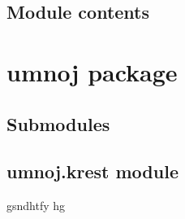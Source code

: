 \documentclass[letterpaper,10pt,english]{sphinxmanual}
\begin{document}
\begin{fulllineitems}
\label{\detokenize{sum:sum.plus.mary}}
\pysigstartsignatures
{}
\pysigstopsignatures\begin{description}
\begin{quote}\begin{description}
\end{description}\end{quote}

\end{description}

\end{fulllineitems}



\subsection{Module contents}
\label{\detokenize{sum:module-sum}}\label{\detokenize{sum:module-contents}}
\sphinxstepscope


\section{umnoj package}
\label{\detokenize{umnoj:umnoj-package}}\label{\detokenize{umnoj::doc}}

\subsection{Submodules}
\label{\detokenize{umnoj:submodules}}

\subsection{umnoj.krest module}
\label{\detokenize{umnoj:module-umnoj.krest}}\label{\detokenize{umnoj:umnoj-krest-module}}
\sphinxAtStartPar
gsndhtfy hg
\end{document}
